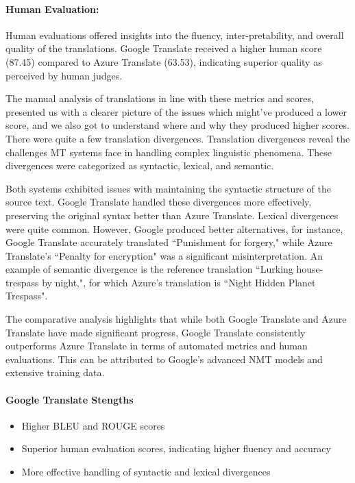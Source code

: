 \paragraph{Human Evaluation:} Human evaluations offered insights into the fluency, inter-pretability, and overall quality of the translations. Google Translate received a higher human score (87.45) compared to Azure Translate (63.53), indicating superior quality as perceived by human judges.

The manual analysis of translations in line with these metrics and scores, presented us with a clearer picture of the issues which might've produced a lower score, and we also got to understand where and why they produced higher scores. There were quite a few translation divergences. Translation divergences reveal the challenges MT systems face in handling complex linguistic phenomena. These divergences were categorized as syntactic, lexical, and semantic. 

Both systems exhibited issues with maintaining the syntactic structure of the source text. Google Translate handled these divergences more effectively, preserving the original syntax better than Azure Translate. Lexical divergences were quite common. However, Google produced better alternatives, for instance, Google Translate accurately translated ``Punishment for forgery," while Azure Translate's ``Penalty for encryption" was a significant misinterpretation. An example of semantic divergence is the reference translation ``Lurking house-trespass by night,", for which Azure's translation is ``Night Hidden Planet Trespass".

 The comparative analysis highlights that while both Google Translate and Azure Translate have made significant progress, Google Translate consistently outperforms Azure Translate in terms of automated metrics and human evaluations. This can be attributed to Google's advanced NMT models and extensive training data. 

 \paragraph{Google Translate Stengths}
 \begin{itemize}
     \item Higher BLEU and ROUGE scores
     \item Superior human evaluation scores, indicating higher fluency and accuracy
     \item More effective handling of syntactic and lexical divergences
 \end{itemize}

